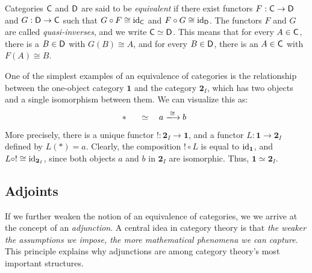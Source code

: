 \begin{definition}
  Categories \( \mathsf{C} \) and \( \mathsf{D} \) are  said to be \emph{equivalent} if there exist functors 
\( F: \mathsf{C} \to \mathsf{D} \) and \( G: \mathsf{D}\to \mathsf{C} \) such that 
\( G \circ F \cong \mathrm{id}_{\mathsf{C}} \) and \( F \circ G \cong \mathrm{id}_{\mathsf{D}} \). 
The functors \( F \) and \( G \) are called \emph{quasi-inverses}, and we write \( \mathsf{C} \simeq \mathsf{D} \).
This means that for every \( A \in \mathsf{C} \), there is a \( B \in \mathsf{D} \) with \( G(B) \cong A \), 
and for every \( B \in \mathsf{D} \), there is an \( A \in \mathsf{C} \) with \( F(A) \cong B \).
\end{definition}

\begin{example}
  One of the simplest examples of an equivalence of categories is the relationship between the one-object category \( \mathbf{1} \) and the category \( \mathbf{2}_I \), which has two objects and a single isomorphism between them. We can visualize this as:
$$
\ast \;\; \quad \simeq \quad a \xlongrightarrow{\;\cong\;} b \;\; 
$$

More precisely, there is a unique functor \( ! : \mathbf{2}_I \to \mathbf{1} \), and a functor \( L : \mathbf{1} \to \mathbf{2}_I \) defined by \( L(\ast) = a \). Clearly, the composition \( ! \circ L \) is equal to \( \mathrm{id}_{\mathbf{1}} \), and \( L \circ ! \cong \mathrm{id}_{\mathbf{2}_I} \), since both objects \( a \) and \( b \) in \( \mathbf{2}_I \) are isomorphic. Thus, \( \mathbf{1} \simeq \mathbf{2}_I \).
\end{example}

\subsection{Adjoints}
If we further weaken the notion of an equivalence of categories, we we arrive at the concept of an \emph{adjunction}. A central idea in category theory is that \emph{the weaker the assumptions we impose, the more mathematical phenomena we can capture}. This principle explains why adjunctions are among category theory's most important structures.

